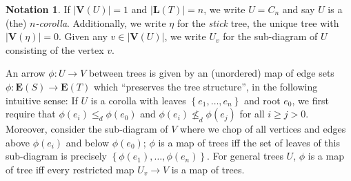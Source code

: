 \documentclass[a4paper,10pt
,draft
]{article}%
\numberwithin{equation}{section}
\numberwithin{figure}{section}
\theoremstyle{definition} %
\newtheorem{notation}[equation]{Notation}%
\newcommand{\set}[1]{\left\{#1\right\}}%
\newcommand{\1}{\ensuremath{\mathbbm 1}}%
\begin{document}
\begin{notation}
      If $|\boldsymbol{V}(U)| = 1$ and $|\boldsymbol{L}(T)|=n$, we write $U = C_n$ and say $U$ is a (the) \textit{$n$-corolla}.
      Additionally, we write $\eta$ for the \textit{stick} tree, the unique tree with $|\boldsymbol{V}(\eta)| = 0$.
      Given any $v \in |\boldsymbol{V}(U)|$, we write $U_v$ for the sub-diagram of $U$ consisting of the vertex $v$.
\end{notation}


An arrow $\phi \colon U \to V$ between trees is given by
an (unordered) map of edge sets $\phi \colon \boldsymbol{E}(S) \to \boldsymbol{E}(T)$
which ``preserves the tree structure'',
in the following intuitive sense:
If $U$ is a corolla with leaves $\set{e_1,\dots, e_n}$ and root $e_0$,
we first require that $\phi(e_i) \leq_d \phi(e_0)$ and $\phi(e_i) \not\leq_d \phi(e_j)$ for all $i \geq j > 0$.
Moreover, consider the sub-diagram of $V$ where we chop of all vertices and edges above $\phi(e_i)$ and below $\phi(e_0)$;
$\phi$ is a map of trees iff the set of leaves of this sub-diagram is precisely $\set{\phi(e_1), \dots, \phi(e_n)}$.
For general trees $U$, $\phi$ is a map of tree iff every restricted map $U_v \to V$ is a map of trees.
\end{document}
